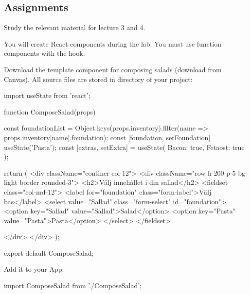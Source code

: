 \documentclass[fleqn, article, a4paper]{memoir}
\begin{document}
\subsection*{Assignments}

\begin{Assignments}

\item Study the relevant material for lecture 3 and 4.

\item You will create React components during the lab. You must use function components with the  hook.

\item Download the template component for composing salads (download from Canvas). All source files are stored in  directory of your project:
\begin{Code}
import { useState } from 'react';

function ComposeSalad(props) {
  const foundationList = Object.keys(props.inventory).filter(name => props.inventory[name].foundation);
  const [foundation, setFoundation] = useState('Pasta');
  const [extras, setExtra] = useState({ Bacon: true, Fetaost: true });

  return (
    <div className="continer col-12">
      <div className="row h-200 p-5 bg-light border rounded-3">
        <h2>Välj innehållet i din sallad</h2>
        <fieldset class="col-md-12">
          <label for="foundation" class="form-label">Välj bas</label>
          <select value="Sallad" class="form-select" id="foundation">
            <option key="Sallad" value="Sallad">Salad</option>
            <option key="Pasta" value="Pasta">Pasta</option>
          </select>
        </fieldset>

      </div>
    </div>
  );
}
export default ComposeSalad;
\end{Code}
\noindent Add it to your App:
\begin{Code}
import ComposeSalad from './ComposeSalad';


\end{Code}
\end{Assignments}
\end{document}
